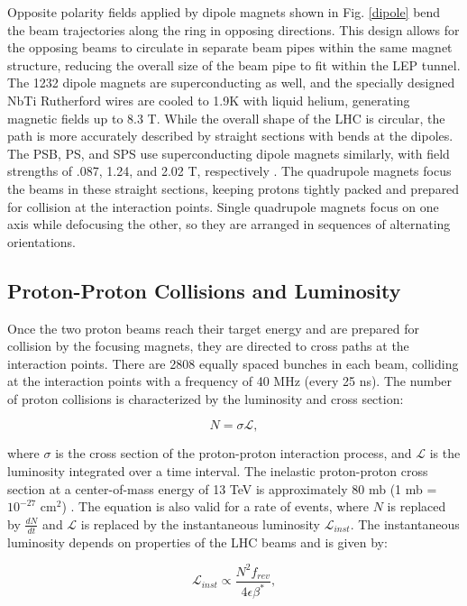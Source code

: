 Opposite polarity fields applied by dipole magnets shown in Fig. \ref{dipole} bend the beam trajectories along the ring in opposing directions.
This design allows for the opposing beams to circulate in separate beam pipes within the same magnet structure, reducing the overall size of the beam pipe to fit within the LEP tunnel.
The 1232 dipole magnets are superconducting as well, and the specially designed NbTi Rutherford wires are cooled to 1.9K with liquid helium, generating magnetic fields up to 8.3 T.
While the overall shape of the LHC is circular, the path is more accurately described by straight sections with bends at the dipoles.
The PSB, PS, and SPS use superconducting dipole magnets similarly, with field strengths of .087, 1.24, and 2.02 T, respectively \cite{Tommasini:1233948}.
The quadrupole magnets focus the beams in these straight sections, keeping protons tightly packed and prepared for collision at the interaction points.
Single quadrupole magnets focus on one axis while defocusing the other, so they are arranged in sequences of alternating orientations.

\subsection{Proton-Proton Collisions and Luminosity}
Once the two proton beams reach their target energy and are prepared for collision by the focusing magnets, they are directed to cross paths at the interaction points.
There are 2808 equally spaced bunches in each beam, colliding at the interaction points with a frequency of 40 MHz (every 25 ns).
The number of proton collisions is characterized by the luminosity and cross section:

\begin{equation}\label{N_collisions}
    N = \sigma \mathcal{L},
\end{equation}

where $\sigma$ is the cross section of the proton-proton interaction process, and $\mathcal{L}$ is the luminosity integrated over a time interval.
The inelastic proton-proton cross section at a center-of-mass energy of 13 TeV is approximately 80 mb (1 mb = $10^{-27}$ cm$^2$) \cite{Aaboud:2016mmw}.
The equation is also valid for a rate of events, where $N$ is replaced by $\frac{dN}{dt}$ and $\mathcal{L}$ is replaced by the instantaneous luminosity $\mathcal{L}_{inst}$.
The instantaneous luminosity depends on properties of the LHC beams and is given by:

\begin{equation}\label{luminosity}
    \mathcal{L}_{inst} \propto \frac{N^2 f_{rev}}{4 \epsilon \beta^*},
\end{equation}

